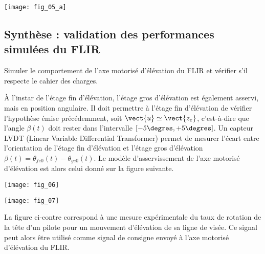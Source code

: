 \begin{center}
\texttt{[image: fig\_05\_a]}
\end{center}




\ifprof
\begin{corrige}
\end{corrige}
\else
\fi

\subsection*{Synthèse : validation des performances simulées du FLIR}
\begin{obj}
Simuler le comportement de l’axe motorisé d’élévation du FLIR et vérifier s’il respecte le cahier des
charges.
\end{obj}



À l’instar de l’étage fin d’élévation, l’étage gros d’élévation est également asservi, mais en position angulaire. Il
doit permettre à l’étage fin d’élévation de vérifier l’hypothèse émise précédemment, soit $\vect{u}\simeq \vect{z_e}$, c’est-à-dire que l’angle $\beta(t)$ doit rester dans l’intervalle $[-5\degres, +5\degres]$.
Un capteur LVDT (Linear Variable Differential Transformer) permet de mesurer l’écart entre l’orientation de
l’étage fin d’élévation et l’étage gros d’élévation $\beta(t)=\theta_{fe0}(t)-\theta_{ge0}(t)$. Le modèle d’asservissement de l’axe
motorisé d’élévation est alors celui donné sur la figure suivante. 

\begin{center}
\texttt{[image: fig\_06]}
\end{center}


\begin{marginfigure}
\texttt{[image: fig\_07]}
\end{marginfigure}

La figure ci-contre correspond à une mesure expérimentale du taux de rotation de la tête d’un pilote pour un mouvement
d’élévation de sa ligne de visée. Ce signal peut alors être utilisé comme signal de consigne envoyé à l’axe motorisé
d’élévation du FLIR.






